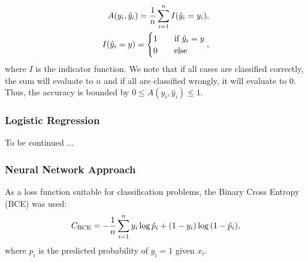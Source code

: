     \begin{align}
        A(y_i, \hat{y}_i) = \frac{1}{n}\sum_{i=1}^{n} I(\hat{y}_i = y_i), \\
        I(\hat{y}_i = y) = \begin{cases}
            1\hspace{10px}&\text{if }\hat{y}_i = y \\
            0\hspace{10px}&\text{else}
        \end{cases} \nonumber,
    \end{align}
    where $I$ is the indicator function. We note that if all cases are classified correctly, the sum will evaluate to $n$ and if all are classified wrongly, it will evaluate to 0. Thus, the accuracy is bounded by $0 \leq A(y_i, \hat{y}_i) \leq 1$.

    \subsubsection*{Logistic Regression}
    To be continued ...

    \subsubsection*{Neural Network Approach}
    As a loss function suitable for classification problems, the Binary Cross Entropy (BCE) \cite{BCE} was used:
    \begin{align}
        {C}_\text{BCE} = -\frac{1}{n}\sum_{i=1}^{n} y_i \log{\hat{p}_i} + (1-y_i) \log{(1-\hat{p}_i)},
        \label{eq:BCE_loss_function}
    \end{align} 
    where $\hat{p}_i$ is the predicted probability of $y_i = 1$ given $x_i$.  